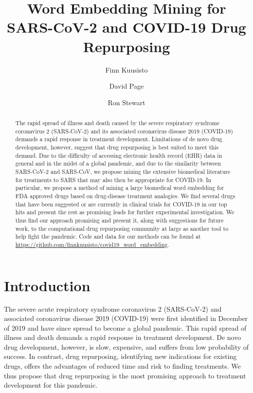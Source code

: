 \documentclass{article}
\begin{document}
\title{Word Embedding Mining for SARS-CoV-2 and COVID-19 Drug Repurposing}
\author[1]{Finn Kuusisto}
\author[2]{David Page}
\author[1]{Ron Stewart}
\maketitle

\begin{abstract}

The rapid spread of illness and death caused by the severe respiratory syndrome coronavirus 2 (SARS-CoV-2) and its associated coronavirus disease 2019 (COVID-19) demands a rapid response in treatment development.
Limitations of de novo drug development, however, suggest that drug repurposing is best suited to meet this demand.
Due to the difficulty of accessing electronic health record (EHR) data in general and in the midst of a global pandemic, and due to the similarity between SARS-CoV-2 and SARS-CoV, we propose mining the extensive biomedical literature for treatments to SARS that may also then be appropriate for COVID-19.
In particular, we propose a method of mining a large biomedical word embedding for FDA approved drugs based on drug-disease treatment analogies.
We find several drugs that have been suggested or are currently in clinical trials for COVID-19 in our top hits and present the rest as promising leads for further experimental investigation.
We thus find our approach promising and present it, along with suggestions for future work, to the computational drug repurposing community at large as another tool to help fight the pandemic.
Code and data for our methods can be found at \url{https://github.com/finnkuusisto/covid19_word_embedding}.

\end{abstract}

\section{Introduction}

The severe acute respiratory syndrome coronavirus 2 (SARS-CoV-2) and associated coronavirus disease 2019 (COVID-19) were first identified in December of 2019 and have since spread to become a global pandemic\cite{world2020director}.
This rapid spread of illness and death demands a rapid response in treatment development.
De novo drug development, however, is slow, expensive, and suffers from low probability of success\cite{ashburn2004drug}.
In contrast, drug repurposing, identifying new indications for existing drugs, offers the advantages of reduced time and risk to finding treatments.
We thus propose that drug repurposing is the most promising approach to treatment development for this pandemic.
\end{document}
